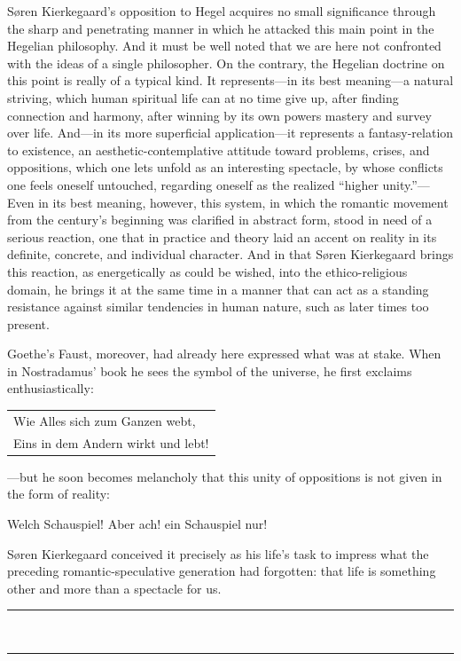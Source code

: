 \documentclass[12pt,a4paper]{book}
\newcommand{\opage}[1]{\marginnote{\footnotesize\textit{[#1]}}}
\begin{document}
Søren Kierkegaard's opposition to Hegel acquires no small significance
through the sharp and penetrating manner in which he attacked this main
point in the Hegelian philosophy. And it must be well noted that we are
here not confronted with the ideas of a single philosopher. On the
contrary, the Hegelian doctrine on this point is really of a typical
kind. It represents---in its best meaning---a natural striving, which
human spiritual life can at no time give up, after finding connection and
harmony, after winning by its own powers mastery and survey over life.
And---in its more superficial application---it represents a
fantasy-relation to existence, an aesthetic-contemplative attitude toward
problems, crises, and oppositions, which one lets unfold as an
interesting spectacle, by whose conflicts one feels oneself untouched,
regarding oneself as the realized ``higher unity.''---Even in its best
meaning, however, this system, in which the romantic movement from the
century's beginning was clarified in abstract form, stood in need of a
serious reaction, one that in practice and theory laid an accent on
reality in its definite, concrete, and individual character. And in that
Søren Kierkegaard brings this reaction, as energetically as could be
wished, into the ethico-religious domain, he brings it at the same time
in a manner that can act as a standing resistance against similar
tendencies in human nature, such as later times too present.

Goethe's Faust, moreover, had already here expressed what was at stake.
When in Nostradamus' book he sees the symbol of the universe, he first
exclaims enthusiastically:

\opage{15}\begin{center}\small\begin{tabular}{@{}l@{}}
Wie Alles sich zum Ganzen webt,\\
Eins in dem Andern wirkt und lebt!
\end{tabular}\end{center}
---but he soon becomes melancholy that this unity of oppositions
is not given in the form of reality:
\begin{center}\small Welch Schauspiel! Aber ach! ein Schauspiel nur!\end{center}

Søren Kierkegaard conceived it precisely as his life's task to
impress what the preceding romantic-speculative generation had forgotten:
that life is something other and more than a spectacle for us.
\begin{center}\rule{2cm}{0.4pt}\\[-8pt]\rule{2cm}{0.4pt}\end{center}
\end{document}

